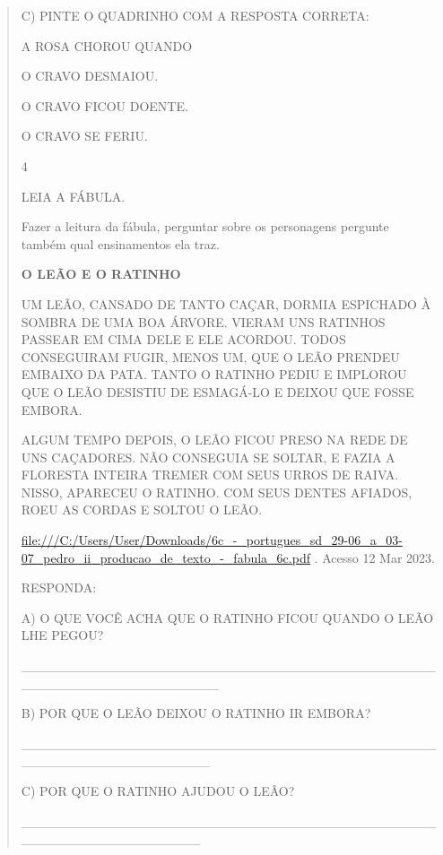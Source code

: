 \begin{verse}
{

C) PINTE O QUADRINHO COM A RESPOSTA CORRETA:

A ROSA CHOROU QUANDO

O CRAVO DESMAIOU.

O CRAVO FICOU DOENTE.

O CRAVO SE FERIU.

\num{4}

LEIA A FÁBULA.

Fazer a leitura da fábula, perguntar sobre os personagens pergunte
também qual ensinamentos ela traz.

\textbf{O LEÃO E O RATINHO}

UM LEÃO, CANSADO DE TANTO CAÇAR, DORMIA ESPICHADO À SOMBRA DE UMA BOA
ÁRVORE. VIERAM UNS RATINHOS PASSEAR EM CIMA DELE E ELE ACORDOU. TODOS
CONSEGUIRAM FUGIR, MENOS UM, QUE O LEÃO PRENDEU EMBAIXO DA PATA. TANTO O
RATINHO PEDIU E IMPLOROU QUE O LEÃO DESISTIU DE ESMAGÁ-LO E DEIXOU QUE
FOSSE EMBORA.

ALGUM TEMPO DEPOIS, O LEÃO FICOU PRESO NA REDE DE UNS CAÇADORES. NÃO
CONSEGUIA SE SOLTAR, E FAZIA A FLORESTA INTEIRA TREMER COM SEUS URROS DE
RAIVA. NISSO, APARECEU O RATINHO. COM SEUS DENTES AFIADOS, ROEU AS
CORDAS E SOLTOU O LEÃO.

\url{file:///C:/Users/User/Downloads/6c_-_portugues_sd_29-06_a_03-07_pedro_ii_producao_de_texto_-_fabula_6c.pdf}
. Acesso 12 Mar 2023.

RESPONDA:

A) O QUE VOCÊ ACHA QUE O RATINHO FICOU QUANDO O LEÃO LHE PEGOU?

\_\_\_\_\_\_\_\_\_\_\_\_\_\_\_\_\_\_\_\_\_\_\_\_\_\_\_\_\_\_\_\_\_\_\_\_\_\_\_\_\_\_\_\_\_\_\_\_\_\_\_\_\_\_\_\_\_\_\_\_\_\_\_\_\_


B) POR QUE O LEÃO DEIXOU O RATINHO IR EMBORA?

\_\_\_\_\_\_\_\_\_\_\_\_\_\_\_\_\_\_\_\_\_\_\_\_\_\_\_\_\_\_\_\_\_\_\_\_\_\_\_\_\_\_\_\_\_\_\_\_\_\_\_\_\_\_\_\_\_\_\_\_\_\_\_\_


C) POR QUE O RATINHO AJUDOU O LEÂO?

\_\_\_\_\_\_\_\_\_\_\_\_\_\_\_\_\_\_\_\_\_\_\_\_\_\_\_\_\_\_\_\_\_\_\_\_\_\_\_\_\_\_\_\_\_\_\_\_\_\_\_\_\_\_\_\_\_\_\_\_\_\_\_


}
\end{verse}
